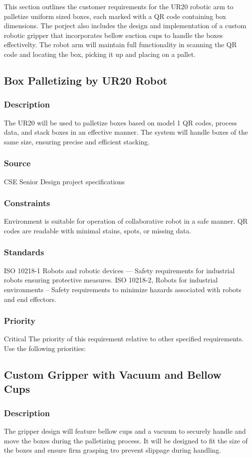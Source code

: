 This section outlines the customer requirements for the UR20 robotic arm to palletize uniform sized boxes, each marked with a QR code containing box dimensions. The porject also includes the design and implementation of a custom robotic gripper that incorporates bellow suction cups to handle the boxes effectivelty. The robot arm will maintain full functionality in scanning the QR code and locating the box, picking it up and placing on a pallet. 
\subsection{Box Palletizing by UR20 Robot}
\subsubsection{Description}
The UR20 will be used to palletize boxes based on model 1 QR codes, process data, and stack boxes in an effective manner. The system will handle boxes of the same size, ensuring precise and efficient stacking.
\subsubsection{Source}
 CSE Senior Design project specifications
\subsubsection{Constraints}
Environment is suitable for operation of collaborative robot in a safe manner. QR codes are readable with minimal stains, spots, or missing data.
\subsubsection{Standards}
ISO 10218-1 Robots and robotic devices — Safety requirements for industrial robots ensuring protective measures.
ISO 10218-2, Robots for industrial environments – Safety requirements to minimize hazards associated with robots and end effectors.
\subsubsection{Priority}
Critical
The priority of this requirement relative to other specified requirements. Use the following priorities:

\subsection{Custom Gripper with Vacuum and Bellow Cups}
\subsubsection{Description}
The gripper design will feature bellow cups and a vacuum to securely handle and move the boxes during the palletizing process. It will be designed to fit the size of the boxes and ensure firm grasping tro prevent slippage during handling.
